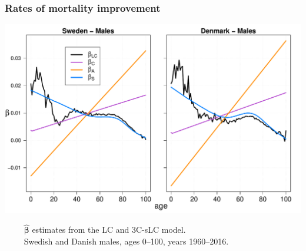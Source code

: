 \documentclass[12pt, xcolor=table]{beamer}  %
\begin{document}
\begin{frame}[noframenumbering]           
	\frametitle{Rates of mortality improvement}
	\begin{center}
		\includegraphics[scale=0.41]{Figures/Ch5/Beta2}
	\end{center}
		\vspace{-0.35cm}
\tiny{$\quad\quad$ $\bm{\hat{\beta}}$ estimates from the LC and 3C-sLC model. \\ $\quad\quad$ Swedish and Danish males, ages 0--100, years 1960--2016.}

\end{frame}
\end{document}
